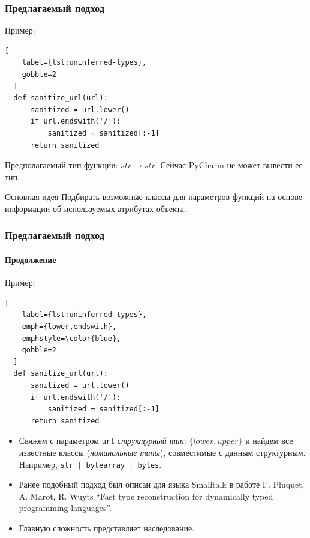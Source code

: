 \documentclass{beamer}
\begin{document}
\begin{frame}[fragile]
  \frametitle{Предлагаемый подход}
  
  Пример:
  \begin{lstlisting}[
    label={lst:uninferred-types},
    gobble=2
  ]
  def sanitize_url(url):
      sanitized = url.lower()
      if url.endswith('/'):
          sanitized = sanitized[:-1]
      return sanitized
  \end{lstlisting}
  
 Предполагаемый тип функции: $str \rightarrow str$. Сейчас PyCharm не может
 вывести ее тип.

 \begin{block}{Основная идея}
   Подбирать возможные классы для параметров функций на основе информации об
   используемых атрибутах объекта. 
 \end{block}
    
\end{frame}

\begin{frame}[fragile]
  \frametitle{Предлагаемый подход}
  \framesubtitle{Продолжение}
  
  Пример:
  \begin{lstlisting}[
    label={lst:uninferred-types},
    emph={lower,endswith},
    emphstyle=\color{blue},
    gobble=2
  ]
  def sanitize_url(url):
      sanitized = url.lower()
      if url.endswith('/'):
          sanitized = sanitized[:-1]
      return sanitized
  \end{lstlisting}

  \begin{itemize}
      \item Свяжем с параметром  \texttt{url} \emph{структурный тип}: $\{ lower,
        upper \}$ и найдем все известные классы (\emph{номинальные типы}),
        совместимые с данным структурным. Например, \texttt{str | bytearray | bytes}.

      \item Ранее подобный подход был описан для языка Smalltalk в работе F.
        Pluquet, A.  Marot, R. Wuyts ``Fast type reconstruction for dynamically
        typed programming languages''.

      \item Главную сложность представляет наследование.
  \end{itemize}
  


\end{frame}
\end{document}
